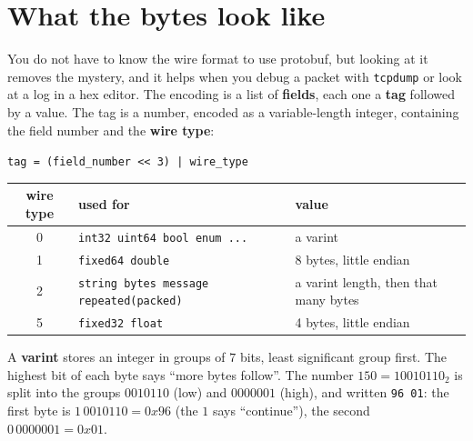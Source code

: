 \section*{What the bytes look like}
You do not have to know the wire format to use protobuf, but looking at it removes the mystery, and it helps when you debug a packet with \verb!tcpdump! or look at a log in a hex editor. The encoding is a list of \textbf{fields}, each one a \textbf{tag} followed by a value. The tag is a number, encoded as a variable-length integer, containing the field number and the \textbf{wire type}:
\begin{center}
\verb!tag = (field_number << 3) | wire_type!
\end{center}
\begin{center}
\renewcommand{\arraystretch}{1.2}
\begin{tabular}{cp{5.6cm}p{5.2cm}}
\textbf{wire type} & \textbf{used for} & \textbf{value}\\ \hline
0 & \verb!int32 uint64 bool enum ...! & a varint\\
1 & \verb!fixed64 double! & 8 bytes, little endian\\
2 & \verb!string bytes message repeated(packed)! & a varint length, then that many bytes\\
5 & \verb!fixed32 float! & 4 bytes, little endian\\
\end{tabular}
\end{center}
A \textbf{varint} stores an integer in groups of $7$ bits, least significant group first. The highest bit of each byte says ``more bytes follow''. The number $150=10010110_2$ is split into the groups $0010110$ (low) and $0000001$ (high), and written \verb!96 01!: the first byte is $1\,0010110=0x96$ (the $1$ says ``continue''), the second $0\,0000001=0x01$.
